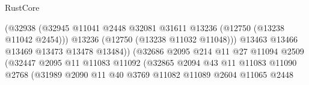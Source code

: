 \begin{lexlean}{RustCore}
\begin{coremodule}
                                                  (@32938
                                                    (@32945
                                                      @11041
                                                      @2448
                                                      @32081
                                                      @31611
                                                      @13236
                                                      (@12750 (@13238 @11042 @2454)))
                                                    @13236
                                                    (@12750 (@13238 @11032 @11048)))
                                                  @13463
                                                  @13466
                                                  @13469
                                                  @13473
                                                  @13478
                                                  @13484))
                                              (@32686
                                                @2095
                                                @214
                                                @11
                                                @27
                                                @11094
                                                @2509
                                                (@32447
                                                  @2095
                                                  @11
                                                  @11083
                                                  @11092
                                                  (@32865
                                                    @2094
                                                    @43
                                                    @11
                                                    @11083
                                                    @11090
                                                    @2768
                                                    (@31989
                                                      @2090
                                                      @11
                                                      @40
                                                      @3769
                                                      @11082
                                                      @11089
                                                      @2604
                                                      @11065
                                                      @2448

\end{coremodule}
\end{lexlean}
